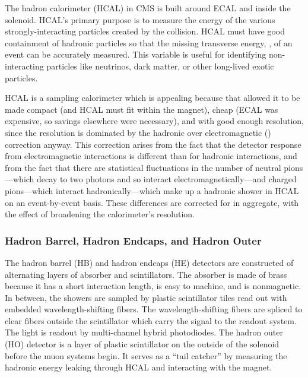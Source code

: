 The hadron calorimeter (HCAL) in CMS is built around ECAL and inside the
solenoid. HCAL's primary purpose is to measure the energy of the various
strongly-interacting particles created by the collision. HCAL must have good
containment of hadronic particles so that the missing transverse energy, \MET,
of an event can be accurately measured. This variable is useful for identifying
non-interacting particles like neutrinos, dark matter, or other long-lived
exotic particles.

HCAL is a sampling calorimeter which is appealing because that allowed it to be
made compact (and HCAL must fit within the magnet), cheap (ECAL was expensive,
so savings elsewhere were necessary), and with good enough resolution, since
the resolution is dominated by the hadronic over electromagnetic (\HOverE)
correction anyway. This correction arises from the fact that the detector
response from electromagnetic interactions is different than for hadronic
interactions, and from the fact that there are statistical fluctuations in the
number of neutral pions---which decay to two photons and so interact
electromagnetically---and charged pions---which interact hadronically---which
make up a hadronic shower in HCAL on an event-by-event basis. These differences
are corrected for in aggregate, with the effect of broadening the calorimeter's
resolution.

\subsubsection{Hadron Barrel, Hadron Endcaps, and Hadron Outer}

The hadron barrel (HB) and hadron endcaps (HE) detectors are constructed of
alternating layers of absorber and scintillators. The absorber is made of brass
because it has a short interaction length, is easy to machine, and is
nonmagnetic. In between, the showers are sampled by plastic scintillator tiles
read out with embedded wavelength-shifting fibers. The wavelength-shifting
fibers are spliced to clear fibers outside the scintillator which carry the
signal to the readout system. The light is readout by multi-channel hybrid
photodiodes. The hadron outer (HO) detector is a layer of plastic scintillator
on the outside of the solenoid before the muon systems begin. It serves as a
``tail catcher'' by measuring the hadronic energy leaking through HCAL and
interacting with the magnet.


